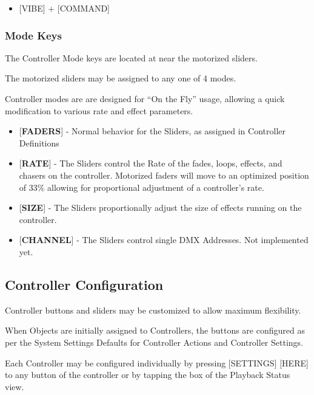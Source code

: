 \documentclass[
]{article}
\providecommand{\tightlist}{%
  \setlength{\itemsep}{0pt}\setlength{\parskip}{0pt}}
\begin{document}
\begin{itemize}
\tightlist
\item
  {[}VIBE{]} + {[}COMMAND{]}
\end{itemize}

\hypertarget{mode-keys}{%
\subsubsection{Mode Keys}\label{mode-keys}}

The Controller Mode keys are located at near the motorized sliders.

The motorized sliders may be assigned to any one of 4 modes.

Controller modes are are designed for ``On the Fly'' usage, allowing a quick modification to various rate and effect parameters.

\begin{itemize}
\item
  {[}\textbf{FADERS}{]} - Normal behavior for the Sliders, as assigned in Controller Definitions
\item
  {[}\textbf{RATE}{]} - The Sliders control the Rate of the fades, loops, effects, and chasers on the controller. Motorized faders will move to an optimized position of 33\% allowing for proportional adjustment of a controller's rate.
\item
  {[}\textbf{SIZE}{]} - The Sliders proportionally adjust the size of effects running on the controller.
\item
  {[}\textbf{CHANNEL}{]} - The Sliders control single DMX Addresses. {Not implemented yet.}
\end{itemize}

\hypertarget{Controller-Configuration-11.4}{%
\subsection{Controller Configuration}\label{Controller-Configuration-11.4}}

Controller buttons and sliders may be customized to allow maximum flexibility.

When Objects are initially assigned to Controllers, the buttons are configured as per the System Settings Defaults for Controller Actions and Controller Settings.

Each Controller may be configured individually by pressing {[}SETTINGS{]} {[}HERE{]} to any button of the controller or by tapping the box of the Playback Status view.
\end{document}

